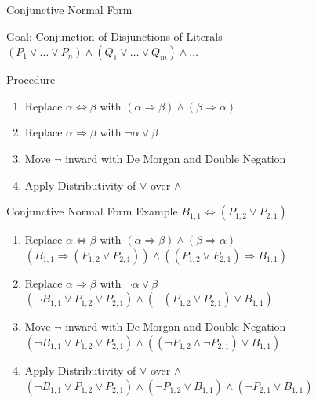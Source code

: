 \documentclass[14pt]{beamer}
\newcommand{\limpl}{\Rightarrow}
\newcommand{\liff}{\Leftrightarrow}
\begin{document}
\begin{frame}{Conjunctive Normal Form}
	\begin{block}{Goal: Conjunction of Disjunctions of Literals}
		$(P_1 \lor \ldots \lor P_n) \land (Q_1 \lor \ldots \lor Q_m) \land \ldots$
	\end{block}
	\begin{block}{Procedure}
		\begin{enumerate}
			\item Replace $\alpha \liff \beta$ with $(\alpha\limpl \beta)\land (\beta\limpl \alpha)$
			\item Replace $\alpha \limpl \beta$ with $\lnot\alpha \lor \beta$
			\item Move $\lnot$ inward with De Morgan and Double Negation
			\item Apply Distributivity of $\lor$ over $\land$
		\end{enumerate}
	\end{block}
\end{frame}
\begin{frame}{Conjunctive Normal Form Example}
	\hspace{2em} $B_{1,1} \liff (P_{1,2} \lor P_{2,1})$
	\begin{enumerate}
		\pause\vspace{.5em}\item
			Replace $\alpha \liff \beta$ with $(\alpha \limpl \beta)\land (\beta\limpl \alpha)$ \\
			\pause
			$(B_{1,1} \limpl (P_{1,2} \lor P_{2,1})) \land ((P_{1,2} \lor P_{2,1}) \limpl B_{1,1})$
		
		\pause\vspace{.5em}\item
			Replace $\alpha \limpl \beta$ with $\lnot\alpha \lor \beta$ \\
			\pause
			$(\lnot B_{1,1} \lor P_{1,2} \lor P_{2,1}) \land (\lnot(P_{1,2} \lor P_{2,1}) \lor B_{1,1})$
		
		\pause\vspace{.5em}\item
			Move $\lnot$ inward with De Morgan and Double Negation \\
			\pause
			$(\lnot B_{1,1} \lor P_{1,2} \lor P_{2,1}) \land ((\lnot P_{1,2} \land \lnot P_{2,1}) \lor B_{1,1})$
		
		\pause\vspace{.5em}\item
			Apply Distributivity of $\lor$ over $\land$ \\
			\pause
			$(\lnot B_{1,1} \lor P_{1,2} \lor P_{2,1}) \land (\lnot P_{1,2} \lor B_{1,1}) \land (\lnot P_{2,1} \lor B_{1,1})$
	\end{enumerate}
\end{frame}
\end{document}
